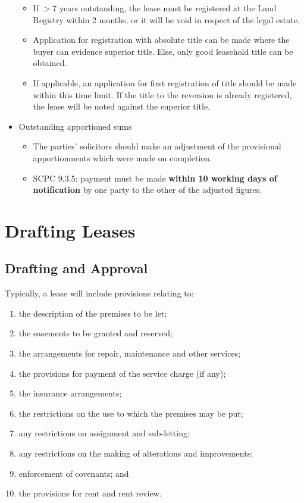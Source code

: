\documentclass[
]{article}
\providecommand{\tightlist}{%
  \setlength{\itemsep}{0pt}\setlength{\parskip}{0pt}}
\begin{document}
\begin{itemize}
  \begin{itemize}
  \tightlist
  \item
    If \(>7\) years outstanding, the lease must be registered at the
    Land Registry within 2 months, or it will be void in respect of the
    legal estate.
  \item
    Application for registration with absolute title can be made where
    the buyer can evidence superior title. Else, only good leasehold
    title can be obtained.
  \item
    If applicable, an application for first registration of title should
    be made within this time limit. If the title to the reversion is
    already registered, the lease will be noted against the superior
    title.
  \end{itemize}
\item
  Outstanding apportioned sums

  \begin{itemize}
  \tightlist
  \item
    The parties' solicitors should make an adjustment of the provisional
    apportionments which were made on completion.
  \item
    SCPC 9.3.5: payment must be made \textbf{within 10 working days of
    notification} by one party to the other of the adjusted figures.
  \end{itemize}
\end{itemize}

\hypertarget{drafting-leases}{%
\section{Drafting Leases}\label{drafting-leases}}

\hypertarget{drafting-and-approval}{%
\subsection{Drafting and Approval}\label{drafting-and-approval}}

Typically, a lease will include provisions relating to:

\begin{enumerate}
\def\labelenumi{\arabic{enumi}.}
\tightlist
\item
  the description of the premises to be let;
\item
  the easements to be granted and reserved;
\item
  the arrangements for repair, maintenance and other services;
\item
  the provisions for payment of the service charge (if any);
\item
  the insurance arrangements;
\item
  the restrictions on the use to which the premises may be put;
\item
  any restrictions on assignment and sub-letting;
\item
  any restrictions on the making of alterations and improvements;
\item
  enforcement of covenants; and
\item
  the provisions for rent and rent review.
\end{enumerate}
\end{document}
